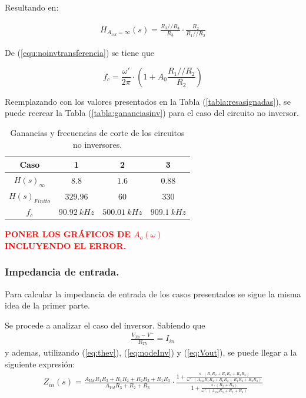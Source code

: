Resultando en:

\begin{align}
	H_{A_{vol}=\infty} \left(s \right) = \frac{R_3 // R_4}{R_3} \cdot \frac{R_2}{R_1 // R_2}
		\label{equ:noinvtransferencia_ideal}
\end{align}

De (\ref{equ:noinvtransferencia}) se tiene que

\begin{equation}
	f_c = \frac{\omega'}{2 \pi}\cdot \left( 1 + A_{0} \frac{R_1 // R_2}{R_2} \right)
\end{equation}

Reemplazando con los valores presentados en la Tabla (\ref{tabla:resasignadas}), se puede recrear la Tabla (\ref{tabla:gananciasinv}) para el caso del circuito no inversor.

\begin{table}[H]
\begin{center}
\begin{tabular}{|c|c|c|c|}
\hline
\textbf{Caso}            & \textbf{1} & \textbf{2} & \textbf{3} \\ \hline
\textbf{$H(s)_{\infty}$} & $8.8$         & $1.6$          & $0.88$        \\ \hline
\textbf{$H(s)_{Finito}$} & $329.96$     & $60$     & $330$     \\ \hline
\textbf{$f_c$}           & $90.92 \ kHz$   & $500.01 \ kHz$  & $909.1 \ kHz$     \\ \hline
\end{tabular}
\caption{Ganancias y frecuencias de corte de los circuitos no inversores.}
\end{center}
\end{table}

\begin{center}
\textcolor{red}{\textbf{PONER LOS GRÁFICOS DE $A_o(\omega)$}}\\
\textcolor{red}{\textbf{INCLUYENDO EL ERROR.}}
\end{center}

\subsubsection{Impedancia de entrada.}

Para calcular la impedancia de entrada de los casos presentados se sigue la misma idea de la primer parte.

Se procede a analizar el caso del inversor. Sabiendo que
\begin{align}
\label{eq:Zin}
\frac{V_{Th} - V^-}{R_{Th}}=I_{in}
\end{align}
y ademas, utilizando (\ref{eq:thev}), (\ref{eq:nodeInv}) y (\ref{eq:Vout}), se puede llegar a la siguiente expresión:
\begin{align}
	Z_{in}(s)=\frac{A_{Vol}R_1R_3+R_1R_2+R_2R_3+R_1R_3}{A_{Vol}R_3+R_2+R_3}\cdot \frac{1+\frac{s\cdot (R_1R_2+R_1R_3+R_2R_3)}{\omega ' \cdot (A_{Vol}R_1R_3+R_1R_2+R_1R_3+R_2R_3)}}{1+\frac{s\cdot (R_2+R_3)}{\omega ' \cdot(A_{Vol}R_3+R_2+R_3)}}
\end{align}

